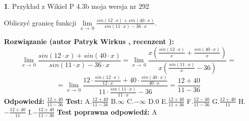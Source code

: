 \documentclass[12pt, a4paper]{article}
\theoremstyle{definition} %
\newtheorem{zad}{}
\newcommand{\zadStart}[1]{\begin{zad}#1\newline}
\newcommand{\zadStop}{\end{zad}}
\newcommand{\rozwStart}[2]{\noindent \textbf{Rozwiązanie (autor #1 , recenzent #2): }\newline}
\newcommand{\rozwStop}{\newline}
\newcommand{\odpStart}{\noindent \textbf{Odpowiedź:}\newline}
\newcommand{\odpStop}{\newline}
\newcommand{\testStart}{\noindent \textbf{Test:}\newline}
\newcommand{\testStop}{\newline}
\newcommand{\kluczStart}{\noindent \textbf{Test poprawna odpowiedź:}\newline}
\newcommand{\kluczStop}{\newline}
\begin{document}
\zadStart{Przykład z Wikieł P 4.3b moja wersja nr 292}


Obliczyć granicę funkcji $\lim\limits_{x\to\ 0}\frac{sin(12 \cdot x)+sin(40 \cdot x)}{sin(11 \cdot x)-36 \cdot x}$.
\zadStop
\rozwStart{Patryk Wirkus}{}
$$\lim\limits_{x\to\ 0}\frac{sin(12 \cdot x)+sin(40 \cdot x)}{sin(11 \cdot x)-36 \cdot x}=\lim\limits_{x\to\ 0}\frac{x(\frac{sin(12 \cdot x)}{x}+\frac{sin(40 \cdot x)}{x})}{x(\frac{sin(11 \cdot x)}{x}-36)}=$$
$$=\lim\limits_{x\to\ 0}\frac{12 \cdot \frac{sin(12 \cdot x)}{12 \cdot x}+40 \cdot \frac{sin(40 \cdot x)}{40 \cdot x}}{11 \cdot \frac{sin(11 \cdot x)}{11 \cdot x}-36}=\frac{12+40}{11-36}$$
\rozwStop
\odpStart
$\frac{12+40}{11-36}$
\odpStop
\testStart
A.$\frac{12+40}{11-36}$
B.$\infty$
C.$-\infty$
D.$0$
E.$\frac{12+40}{11+36}$
F.$\frac{12-40}{11-36}$
G.$\frac{12+40}{11}$
H.$-\frac{12+40}{11}$
I.$-\frac{12+40}{11-36}$
\testStop
\kluczStart
A
\kluczStop
\end{document}
